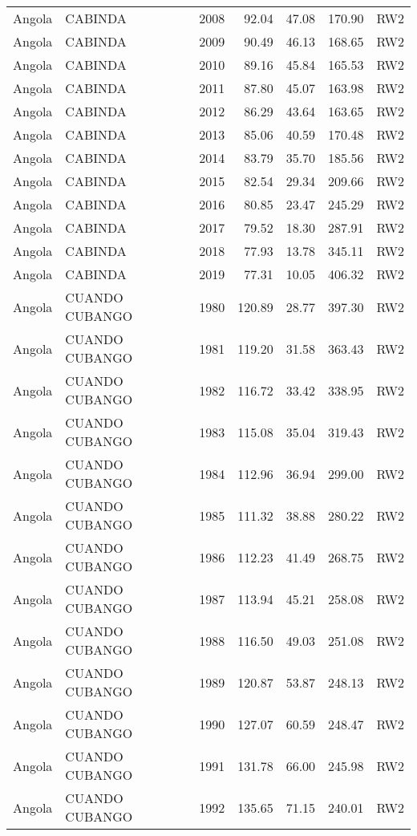 \begin{longtable}{lllrrrl}
  Angola & CABINDA & 2008 & 92.04 & 47.08 & 170.90 & RW2 \\ 
  Angola & CABINDA & 2009 & 90.49 & 46.13 & 168.65 & RW2 \\ 
  Angola & CABINDA & 2010 & 89.16 & 45.84 & 165.53 & RW2 \\ 
  Angola & CABINDA & 2011 & 87.80 & 45.07 & 163.98 & RW2 \\ 
  Angola & CABINDA & 2012 & 86.29 & 43.64 & 163.65 & RW2 \\ 
  Angola & CABINDA & 2013 & 85.06 & 40.59 & 170.48 & RW2 \\ 
  Angola & CABINDA & 2014 & 83.79 & 35.70 & 185.56 & RW2 \\ 
  Angola & CABINDA & 2015 & 82.54 & 29.34 & 209.66 & RW2 \\ 
  Angola & CABINDA & 2016 & 80.85 & 23.47 & 245.29 & RW2 \\ 
  Angola & CABINDA & 2017 & 79.52 & 18.30 & 287.91 & RW2 \\ 
  Angola & CABINDA & 2018 & 77.93 & 13.78 & 345.11 & RW2 \\ 
  Angola & CABINDA & 2019 & 77.31 & 10.05 & 406.32 & RW2 \\ 
  Angola & CUANDO CUBANGO & 1980 & 120.89 & 28.77 & 397.30 & RW2 \\ 
  Angola & CUANDO CUBANGO & 1981 & 119.20 & 31.58 & 363.43 & RW2 \\ 
  Angola & CUANDO CUBANGO & 1982 & 116.72 & 33.42 & 338.95 & RW2 \\ 
  Angola & CUANDO CUBANGO & 1983 & 115.08 & 35.04 & 319.43 & RW2 \\ 
  Angola & CUANDO CUBANGO & 1984 & 112.96 & 36.94 & 299.00 & RW2 \\ 
  Angola & CUANDO CUBANGO & 1985 & 111.32 & 38.88 & 280.22 & RW2 \\ 
  Angola & CUANDO CUBANGO & 1986 & 112.23 & 41.49 & 268.75 & RW2 \\ 
  Angola & CUANDO CUBANGO & 1987 & 113.94 & 45.21 & 258.08 & RW2 \\ 
  Angola & CUANDO CUBANGO & 1988 & 116.50 & 49.03 & 251.08 & RW2 \\ 
  Angola & CUANDO CUBANGO & 1989 & 120.87 & 53.87 & 248.13 & RW2 \\ 
  Angola & CUANDO CUBANGO & 1990 & 127.07 & 60.59 & 248.47 & RW2 \\ 
  Angola & CUANDO CUBANGO & 1991 & 131.78 & 66.00 & 245.98 & RW2 \\ 
  Angola & CUANDO CUBANGO & 1992 & 135.65 & 71.15 & 240.01 & RW2 \\ 

\end{longtable}
